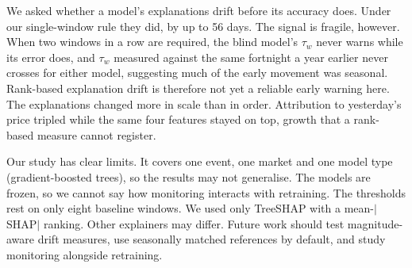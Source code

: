 We asked whether a model's explanations drift before its accuracy does.
Under our single-window rule they did, by up to 56 days. The signal
is fragile, however. When two windows in a row are required, the blind
model's $\tau_w$ never warns while its error does, and $\tau_w$ measured
against the same fortnight a year earlier never crosses for either model,
suggesting much of the early movement was seasonal. Rank-based explanation drift is therefore not yet a reliable early warning
here. The explanations changed more in scale than in order. Attribution to
yesterday's price tripled while the same four features stayed on top, growth
that a rank-based measure cannot register.

Our study has clear limits. It covers one event, one market and one model type (gradient-boosted
trees), so the results may not generalise. The models are frozen, so we
cannot say how monitoring interacts with retraining. The thresholds rest on only eight baseline windows. We used only TreeSHAP
with a mean-$|$SHAP$|$ ranking. Other explainers may differ.
Future work should test magnitude-aware drift measures, use seasonally
matched references by default, and study monitoring alongside retraining.